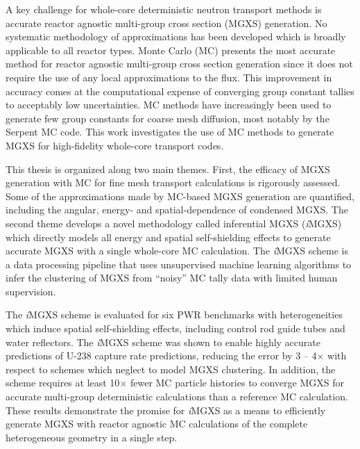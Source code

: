 \begin{abstractpage}

A key challenge for whole-core deterministic neutron transport methods is accurate reactor agnostic multi-group cross section (MGXS) generation. No systematic methodology of approximations has been developed which is broadly applicable to all reactor types. Monte Carlo (MC) presents the most accurate method for reactor agnostic multi-group cross section generation since it does not require the use of any local approximations to the flux. This improvement in accuracy comes at the computational expense of converging group constant tallies to acceptably low uncertainties. MC methods have increasingly been used to generate few group constants for coarse mesh diffusion, most notably by the Serpent MC code. This work investigates the use of MC methods to generate MGXS for high-fidelity whole-core transport codes.


This thesis is organized along two main themes. First, the efficacy of MGXS generation with MC for fine mesh transport calculations is rigorously assessed. Some of the approximations made by MC-based MGXS generation are quantified, including the angular, energy- and spatial-dependence of condensed MGXS. The second theme develops a novel methodology called inferential MGXS (\textit{i}MGXS) which directly models all energy and spatial self-shielding effects to generate accurate MGXS with a single whole-core MC calculation. The \textit{i}MGXS scheme is a data processing pipeline that uses unsupervised machine learning algorithms to infer the clustering of MGXS from ``noisy'' MC tally data with limited human supervision.

The \textit{i}MGXS scheme is evaluated for six PWR benchmarks with heterogeneities which induce spatial self-shielding effects, including control rod guide tubes and water reflectors. The \textit{i}MGXS scheme was shown to enable highly accurate predictions of U-238 capture rate predictions, reducing the error by 3 -- 4$\times$ with respect to schemes which neglect to model MGXS clustering. In addition, the scheme requires at least 10$\times$ fewer MC particle histories to converge MGXS for accurate multi-group deterministic calculations than a reference MC calculation. These results demonstrate the promise for \textit{i}MGXS as a means to efficiently generate MGXS with reactor agnostic MC calculations of the complete heterogeneous geometry in a single step.



\end{abstractpage}
